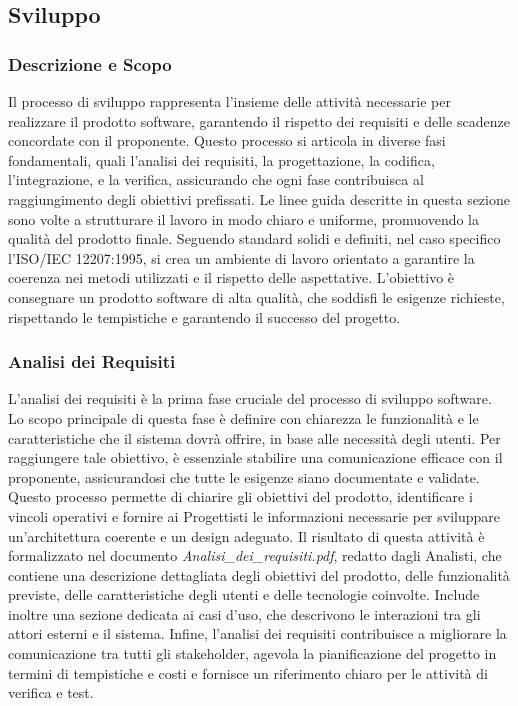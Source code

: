 \subsection{Sviluppo}

\subsubsection{Descrizione e Scopo}
Il processo di sviluppo rappresenta l’insieme delle attività necessarie per realizzare il prodotto software, garantendo il rispetto dei requisiti e delle scadenze concordate con il proponente. Questo processo si articola in diverse fasi fondamentali, quali l'analisi dei requisiti, la progettazione, la codifica, l'integrazione, e la verifica, assicurando che ogni fase contribuisca al raggiungimento degli obiettivi prefissati.
Le linee guida descritte in questa sezione sono volte a strutturare il lavoro in modo chiaro e uniforme, promuovendo la qualità del prodotto finale. Seguendo standard solidi e definiti, nel caso specifico l'ISO/IEC 12207:1995, si crea un ambiente di lavoro orientato a garantire la coerenza nei metodi utilizzati e il rispetto delle aspettative.
L'obiettivo è consegnare un prodotto software di alta qualità, che soddisfi le esigenze richieste, rispettando le tempistiche e garantendo il successo del progetto.\\

\subsubsection{Analisi dei Requisiti}
L’analisi dei requisiti è la prima fase cruciale del processo di sviluppo software. Lo scopo principale di questa fase è definire con chiarezza le funzionalità e le caratteristiche che il sistema dovrà offrire, in base alle necessità degli utenti. Per raggiungere tale obiettivo, è essenziale stabilire una comunicazione efficace con il proponente, assicurandosi che tutte le esigenze siano documentate e validate. Questo processo permette di chiarire gli obiettivi del prodotto, identificare i vincoli operativi e fornire ai Progettisti le informazioni necessarie per sviluppare un’architettura coerente e un design adeguato.
Il risultato di questa attività è formalizzato nel documento \textit{Analisi\_dei\_requisiti.pdf}, redatto dagli Analisti, che contiene una descrizione dettagliata degli obiettivi del prodotto, delle funzionalità previste, delle caratteristiche degli utenti e delle tecnologie coinvolte. Include inoltre una sezione dedicata ai casi d’uso, che descrivono le interazioni tra gli attori esterni e il sistema.
Infine, l’analisi dei requisiti contribuisce a migliorare la comunicazione tra tutti gli stakeholder, agevola la pianificazione del progetto in termini di tempistiche e costi e fornisce un riferimento chiaro per le attività di verifica e test.\\

